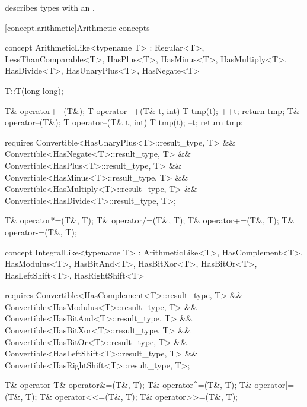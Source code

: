\documentclass[american,twoside]{book}
\begin{document}
\begin{itemdescr}
\pnum
\mbox{\reallynote} describes types with an \mbox{}.
\end{itemdescr}

[concept.arithmetic]{Arithmetic concepts}

\begin{itemdecl}
concept ArithmeticLike<typename T> 
  : Regular<T>, LessThanComparable<T>, HasPlus<T>, HasMinus<T>, HasMultiply<T>, HasDivide<T>, 
    HasUnaryPlus<T>, HasNegate<T> {
  T::T(long long);

  T& operator++(T&);
  T operator++(T& t, int) { T tmp(t); ++t; return tmp; }
  T& operator--(T&);
  T operator--(T& t, int) { T tmp(t); --t; return tmp; }

  requires Convertible<HasUnaryPlus<T>::result_type, T>
        && Convertible<HasNegate<T>::result_type, T>
        && Convertible<HasPlus<T>::result_type, T>
        && Convertible<HasMinus<T>::result_type, T>
        && Convertible<HasMultiply<T>::result_type, T>
        && Convertible<HasDivide<T>::result_type, T>;

  T& operator*=(T&, T);
  T& operator/=(T&, T);
  T& operator+=(T&, T);
  T& operator-=(T&, T);
}
\end{itemdecl}

\begin{itemdescr}
\pnum
{}
\end{itemdescr}

\begin{itemdecl}
concept IntegralLike<typename T> 
  : ArithmeticLike<T>, HasComplement<T>, HasModulus<T>, HasBitAnd<T>, HasBitXor<T>, HasBitOr<T>,
    HasLeftShift<T>, HasRightShift<T> {
  requires Convertible<HasComplement<T>::result_type, T>
        && Convertible<HasModulus<T>::result_type, T>
        && Convertible<HasBitAnd<T>::result_type, T>
        && Convertible<HasBitXor<T>::result_type, T>
        && Convertible<HasBitOr<T>::result_type, T>
        && Convertible<HasLeftShift<T>::result_type, T>
        && Convertible<HasRightShift<T>::result_type, T>;

  T& operator%
  T& operator&=(T&, T);
  T& operator^=(T&, T);
  T& operator|=(T&, T);
  T& operator<<=(T&, T);
  T& operator>>=(T&, T);
}
\end{itemdecl}

\begin{itemdescr}
\pnum 
{}
\end{itemdescr}
\end{document}
